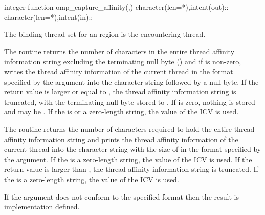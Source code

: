 \begin{fortranspecific}
\begin{ompfFunction}
integer function omp_capture_affinity(,)
character(len=*),intent(out)::
character(len=*),intent(in)::
\end{ompfFunction}
\end{fortranspecific}

\binding
The binding thread set for an  region 
is the encountering thread.

\effect
\begin{ccppspecific}
The  routine returns the number of characters
in the entire thread affinity information string excluding the terminating
null byte () and if  is non-zero, writes the thread
affinity information of the current thread  in the format specified by 
the  argument into the character string  followed 
by a null byte.  If the return value is larger or equal to , the 
thread affinity information string is truncated, with the terminating
null byte stored to {}.  If  is
zero, nothing is stored and  may be . If the 
 is  or a zero-length string, the value of the
 ICV is used.
\end{ccppspecific}

\begin{fortranspecific}
The  routine returns the number of characters
required to hold the entire thread affinity information string and prints 
the thread affinity information of the current thread into the character 
string  with the size of {} in the 
format specified by the  argument. If the  is a 
zero-length string, the value of the  ICV is used. 
If the return value is larger than {}, the thread 
affinity information string is truncated. If the  is a zero-length 
string, the value of the  ICV is used.
\end{fortranspecific}

If the  argument does not conform to the specified format
then the result is implementation defined.

